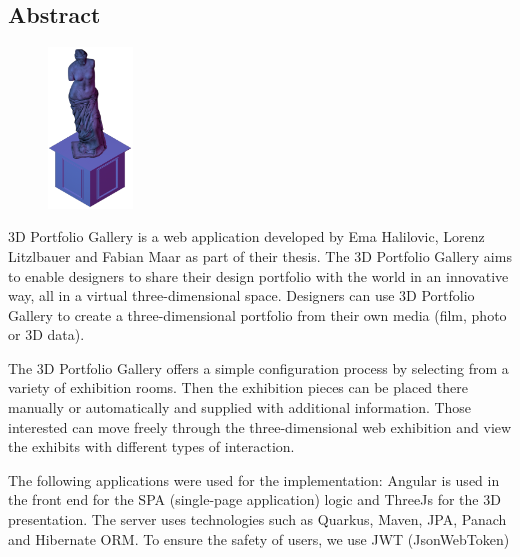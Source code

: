 \begin{spacing}{1}
    \chapter*{Abstract}
\end{spacing}
\begin{figure}
    \begin{center}
      \includegraphics[width=0.2\textwidth]{pics/statue.png}
    \end{center}
\end{figure}
3D Portfolio Gallery is a web application developed by Ema Halilovic, Lorenz Litzlbauer and Fabian Maar as part of their thesis. The 3D Portfolio Gallery aims to enable designers to share their design portfolio with the world in an innovative way, all in a virtual three-dimensional space. Designers can use 3D Portfolio Gallery to create a three-dimensional portfolio from their own media (film, photo or 3D data).

The 3D Portfolio Gallery offers a simple configuration process by selecting from a variety of exhibition rooms. Then the exhibition pieces can be placed there manually or automatically and supplied with additional information.
Those interested can move freely through the three-dimensional web exhibition and view the exhibits with different types of interaction.

The following applications were used for the implementation: Angular is used in the front end for the SPA (single-page application) logic and ThreeJs for the 3D presentation. The server uses technologies such as Quarkus, Maven, JPA, Panach and Hibernate ORM. To ensure the safety of users, we use JWT (JsonWebToken)

